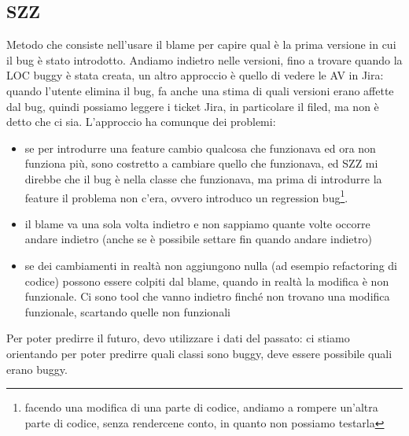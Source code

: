 \documentclass{article}
\begin{document}
\subsection{SZZ}
Metodo che consiste nell'usare il \textsf{blame} per capire qual è la prima versione in cui il bug è stato introdotto. Andiamo indietro nelle versioni, fino a trovare quando la LOC buggy è stata creata, un altro approccio è quello di vedere le AV in Jira: quando l'utente elimina il bug, fa anche una stima di quali versioni erano affette dal bug, quindi possiamo leggere i ticket Jira, in particolare il filed, ma non è detto che ci sia.
L'approccio ha comunque dei problemi: 
\begin{itemize}
\item se per introdurre una feature cambio qualcosa che funzionava ed ora non funziona più, sono costretto a cambiare quello che funzionava, ed SZZ mi direbbe che il bug è nella classe che funzionava, ma prima di introdurre la feature il problema non c'era, ovvero introduco un regression bug\footnote{facendo una modifica di una parte di codice, andiamo a rompere un'altra parte di codice, senza rendercene conto, in quanto non possiamo testarla}.
\item il blame va una sola volta indietro e non sappiamo quante volte occorre andare indietro (anche se è possibile settare fin quando andare indietro)
\item se dei cambiamenti in realtà non aggiungono nulla (ad esempio refactoring di codice) possono essere colpiti dal blame, quando in realtà la modifica è non funzionale. Ci sono tool che vanno indietro finché non trovano una modifica funzionale, scartando quelle non funzionali
\end{itemize}
Per poter predirre il futuro, devo utilizzare i dati del passato: ci stiamo orientando per poter predirre quali classi sono buggy, deve essere possibile quali erano buggy.
\end{document}
